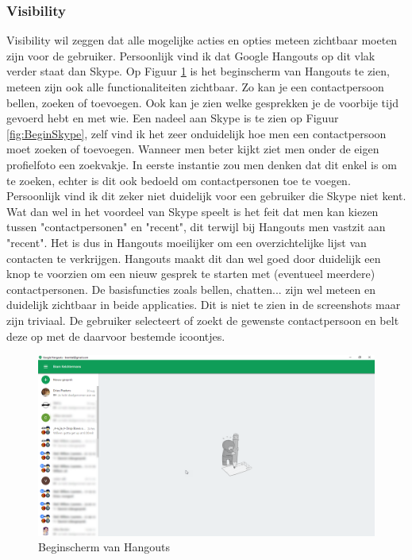 \documentclass[11pt]{article}
\begin{document}
\subsubsection{Visibility}
Visibility wil zeggen dat alle mogelijke acties en opties meteen zichtbaar moeten zijn voor de gebruiker. Persoonlijk vind ik dat Google Hangouts op dit vlak verder staat dan Skype. Op Figuur \ref{fig:BeginHangouts} is het beginscherm van Hangouts te zien, meteen zijn ook alle functionaliteiten zichtbaar. Zo kan je een contactpersoon bellen, zoeken of toevoegen. Ook kan je zien welke gesprekken je de voorbije tijd gevoerd hebt en met wie. Een nadeel aan Skype is te zien op Figuur \ref{fig:BeginSkype}, zelf vind ik het zeer onduidelijk hoe men een contactpersoon moet zoeken of toevoegen. Wanneer men beter kijkt ziet men onder de eigen profielfoto een zoekvakje. In eerste instantie zou men denken dat dit enkel is om te zoeken, echter is dit ook bedoeld om contactpersonen toe te voegen. Persoonlijk vind ik dit zeker niet duidelijk voor een gebruiker die Skype niet kent. Wat dan wel in het voordeel van Skype speelt is het feit dat men kan kiezen tussen "contactpersonen" en "recent", dit terwijl bij Hangouts men vastzit aan "recent". Het is dus in Hangouts moeilijker om een overzichtelijke lijst van contacten te verkrijgen. Hangouts maakt dit dan wel goed door duidelijk een knop te voorzien om een nieuw gesprek te starten met (eventueel meerdere) contactpersonen.
\newline
De basisfuncties zoals bellen, chatten... zijn wel meteen en duidelijk zichtbaar in beide applicaties. Dit is niet te zien in de screenshots maar zijn triviaal. De gebruiker selecteert of zoekt de gewenste contactpersoon en belt deze op met de daarvoor bestemde icoontjes.
\begin{figure}
	\centering
	\includegraphics[width=1\textwidth]{Bram_ScreenshotGH1.png}
	\caption{Beginscherm van Hangouts}
	\label{fig:BeginHangouts}
\end{figure}
\end{document}
